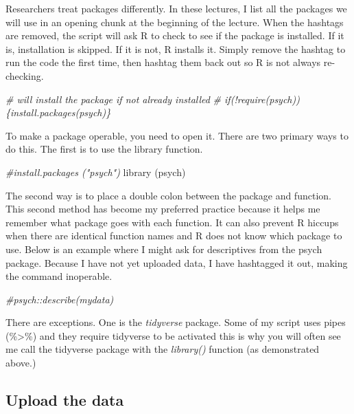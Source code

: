 \documentclass[
  11pt,
]{book}
\newenvironment{Shaded}{\begin{snugshade}}{\end{snugshade}}
\newcommand{\CommentTok}[1]{\textcolor[rgb]{0.56,0.35,0.01}{\textit{#1}}}
\newcommand{\FunctionTok}[1]{\textcolor[rgb]{0.00,0.00,0.00}{#1}}
\newcommand{\NormalTok}[1]{#1}
\begin{document}
Researchers treat packages differently. In these lectures, I list all the packages we will use in an opening chunk at the beginning of the lecture. When the hashtags are removed, the script will ask R to check to see if the package is installed. If it is, installation is skipped. If it is not, R installs it. Simply remove the hashtag to run the code the first time, then hashtag them back out so R is not always re-checking.

\begin{Shaded}
\begin{Highlighting}[]
\CommentTok{\# will install the package if not already installed}
\CommentTok{\# if(!require(psych))\{install.packages(\textquotesingle{}psych\textquotesingle{})\}}
\end{Highlighting}
\end{Shaded}

To make a package operable, you need to open it. There are two primary ways to do this. The first is to use the library function.

\begin{Shaded}
\begin{Highlighting}[]
\CommentTok{\#install.packages ("psych")}
\FunctionTok{library}\NormalTok{ (psych)}
\end{Highlighting}
\end{Shaded}

The second way is to place a double colon between the package and function. This second method has become my preferred practice because it helps me remember what package goes with each function. It can also prevent R hiccups when there are identical function names and R does not know which package to use. Below is an example where I might ask for descriptives from the psych package. Because I have not yet uploaded data, I have hashtagged it out, making the command inoperable.

\begin{Shaded}
\begin{Highlighting}[]
\CommentTok{\#psych::describe(mydata)}
\end{Highlighting}
\end{Shaded}

There are exceptions. One is the \emph{tidyverse} package. Some of my script uses pipes (\%\textgreater\%) and they require tidyverse to be activated this is why you will often see me call the tidyverse package with the \emph{library()} function (as demonstrated above.)

\hypertarget{upload-the-data}{%
\subsection{Upload the data}\label{upload-the-data}}
\end{document}
